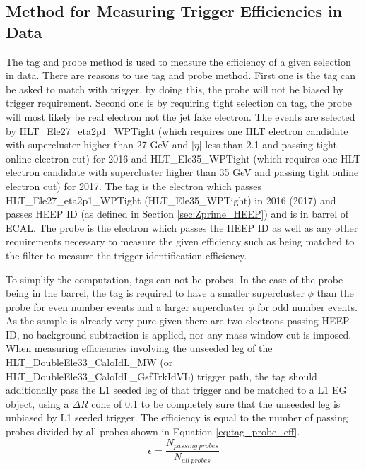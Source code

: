 \subsection{Method for Measuring Trigger Efficiencies in Data}\label{sec:trigger_efficiency_method}
The tag and probe method \cite{CMS-AN-2009-111} is used to measure the efficiency of a given selection in data. There are reasons to use tag and probe method. First one is the tag can be asked to match with trigger, by doing this, the probe will not be biased by trigger requirement. Second one is by requiring tight selection on tag, the probe will most likely be real electron not the jet fake electron. The events are selected by HLT\_Ele27\_eta2p1\_WPTight (which requires one HLT electron candidate with supercluster \et higher than 27 GeV and $|\eta|$ less than 2.1 and passing tight online electron cut) for 2016 and HLT\_Ele35\_WPTight (which requires one HLT electron candidate with supercluster \et higher than 35 GeV and passing tight online electron cut) for 2017. The tag is the electron which passes HLT\_Ele27\_eta2p1\_WPTight (HLT\_Ele35\_WPTight) in 2016 (2017) and passes HEEP ID (as defined in Section \ref{sec:Zprime_HEEP}) and is in barrel of ECAL. The probe is the electron which passes the HEEP ID as well as any other requirements necessary to measure the given efficiency such as being matched to the \et filter to measure the trigger identification efficiency.

To simplify the computation, tags can not be probes. In the case of the probe being in the barrel, the tag is required to have a smaller supercluster $\phi$ than the probe for even number events and a larger supercluster $\phi$ for odd number events. As the sample is already very pure given there are two electrons passing HEEP ID, no background subtraction is applied, nor any mass window cut is imposed. When measuring efficiencies involving the unseeded leg of the HLT\_DoubleEle33\_CaloIdL\_MW (or HLT\_DoubleEle33\_CaloIdL\_GsfTrkIdVL) trigger path, the tag should additionally pass the L1 seeded leg of that trigger and be matched to a L1 EG object, using a $\Delta R$ cone of 0.1 to be completely sure that the unseeded leg is unbiased by L1 seeded trigger. The efficiency is equal to the number of passing probes divided by all probes shown in Equation \ref{eq:tag_probe_eff}.
\begin{equation}
\epsilon=\frac{N_{passing~probes}}{N_{all~probes}}
\label{eq:tag_probe_eff}
\end{equation}

